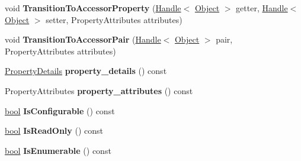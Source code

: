 \begin{DoxyCompactItemize}
\item 
\mbox{\label{classv8_1_1internal_1_1LookupIterator_ac652bfae25b6732d2f2cfe16f9021191}} 
void {\bfseries Transition\+To\+Accessor\+Property} (\mbox{\hyperlink{classv8_1_1internal_1_1Handle}{Handle}}$<$ \mbox{\hyperlink{classv8_1_1internal_1_1Object}{Object}} $>$ getter, \mbox{\hyperlink{classv8_1_1internal_1_1Handle}{Handle}}$<$ \mbox{\hyperlink{classv8_1_1internal_1_1Object}{Object}} $>$ setter, Property\+Attributes attributes)
\item 
\mbox{\label{classv8_1_1internal_1_1LookupIterator_adc45fcbe58da31c4ab68a7e54b3c05b6}} 
void {\bfseries Transition\+To\+Accessor\+Pair} (\mbox{\hyperlink{classv8_1_1internal_1_1Handle}{Handle}}$<$ \mbox{\hyperlink{classv8_1_1internal_1_1Object}{Object}} $>$ pair, Property\+Attributes attributes)
\item 
\mbox{\label{classv8_1_1internal_1_1LookupIterator_a072c93ca1945309202592211efb2a058}} 
\mbox{\hyperlink{classv8_1_1internal_1_1PropertyDetails}{Property\+Details}} {\bfseries property\+\_\+details} () const
\item 
\mbox{\label{classv8_1_1internal_1_1LookupIterator_a30af8db8dad19da275386150b49e34d0}} 
Property\+Attributes {\bfseries property\+\_\+attributes} () const
\item 
\mbox{\label{classv8_1_1internal_1_1LookupIterator_abf694098a132dd288e43a4f7f8eb7451}} 
\mbox{\hyperlink{classbool}{bool}} {\bfseries Is\+Configurable} () const
\item 
\mbox{\label{classv8_1_1internal_1_1LookupIterator_a00331b3bbd0760e9150c753c36adfe60}} 
\mbox{\hyperlink{classbool}{bool}} {\bfseries Is\+Read\+Only} () const
\item 
\mbox{\label{classv8_1_1internal_1_1LookupIterator_ac6f17a7898a26f1d918e3c88615e7295}} 
\mbox{\hyperlink{classbool}{bool}} {\bfseries Is\+Enumerable} () const
\item 
\mbox{\label{classv8_1_1internal_1_1LookupIterator_ac59875d475968cceaed5643fce638312}} 

\end{DoxyCompactItemize}
